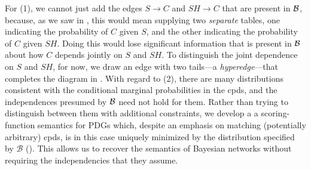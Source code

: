 \documentclass{article}
\theoremstyle{plain}
\theoremstyle{definition}
\theoremstyle{remark}
\newcommand{\dg}[1]{\mathbdcal{#1}}
\newcommand{\PDGof}[1]{{\dg M}_{#1}}
\numberwithin{equation}{section}
\begin{document}
\begin{example}[emulating a BN]
For (1), we cannot just add the edges $S \to C$ and $SH \to C$ that are present
in $\cal B$, because, as we saw in , this would mean
supplying two \emph{separate} tables, one indicating the probability of $C$
given $S$, and the other indicating the probability of $C$ given $\mathit{SH}$.
Doing this would lose significant information that is present in $\cal B$  about
how $C$ depends jointly on $S$ and $SH$. To distinguish the joint dependence on
$S$ and $\mathit{SH}$, for now, we draw an edge with two tails---a
\emph{hyperedge}---that completes the diagram in . 
%
With regard to (2), there are many distributions consistent with the conditional
marginal probabilities in the cpds, and the independences presumed by $\cal B$
need not hold for them. 
Rather than trying to distinguish between them with additional constraints,
we develop a a scoring-function semantics for PDGs
which, despite an emphasis on matching (potentially arbitrary) cpds, is in this case uniquely minimized by the distribution
%
specified by ${\mathcal B}$ ().
This allows us to recover the semantics of Bayesian networks without requiring the independencies that they assume.


\end{example}
\end{document}
